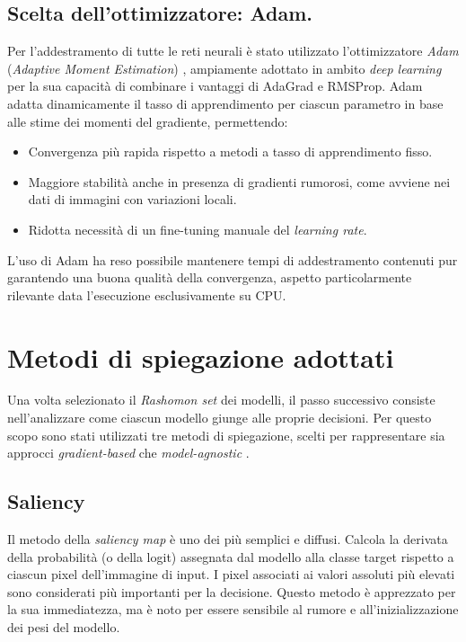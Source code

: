 \documentclass[12pt,a4paper,oneside]{report}
\numberwithin{figure}{chapter}
\numberwithin{table}{chapter}
\begin{document}
\section{Scelta dell’ottimizzatore: Adam.}
Per l’addestramento di tutte le reti neurali è stato utilizzato l’ottimizzatore
\emph{Adam} (\emph{Adaptive Moment Estimation}) \citep{kingma2014adam},
ampiamente adottato in ambito \emph{deep learning} per la sua capacità di
combinare i vantaggi di AdaGrad e RMSProp. Adam adatta dinamicamente il tasso
di apprendimento per ciascun parametro in base alle stime dei momenti del
gradiente, permettendo:
\begin{itemize}
      \item Convergenza più rapida rispetto a metodi a tasso di apprendimento fisso.
      \item Maggiore stabilità anche in presenza di gradienti rumorosi, come avviene nei
            dati di immagini con variazioni locali.
      \item Ridotta necessità di un fine-tuning manuale del \emph{learning rate}.
\end{itemize}
L’uso di Adam ha reso possibile mantenere tempi di addestramento contenuti pur garantendo
una buona qualità della convergenza, aspetto particolarmente rilevante data
l’esecuzione esclusivamente su CPU.

\chapter{Metodi di spiegazione adottati}

Una volta selezionato il \emph{Rashomon set} dei modelli, il passo successivo
consiste nell’analizzare come ciascun modello giunge alle proprie decisioni.
Per questo scopo sono stati utilizzati tre metodi di spiegazione, scelti per
rappresentare sia approcci \emph{gradient-based} che \emph{model-agnostic}
\cite{adadi2018survey,guidotti2018survey}.

\section{Saliency}
Il metodo della \emph{saliency map} \cite{simonyan2013deep,samek2016evaluating}
è uno dei più semplici e diffusi. Calcola la derivata della probabilità (o
della logit) assegnata dal modello alla classe target rispetto a ciascun pixel
dell’immagine di input. I pixel associati ai valori assoluti più elevati sono
considerati più importanti per la decisione. Questo metodo è apprezzato per la
sua immediatezza, ma è noto per essere sensibile al rumore e
all’inizializzazione dei pesi del modello.
\end{document}

